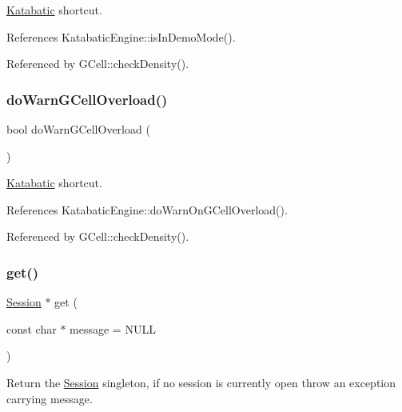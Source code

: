 \mbox{\hyperlink{namespaceKatabatic}{Katabatic}} shortcut. 

References Katabatic\+Engine\+::is\+In\+Demo\+Mode().



Referenced by G\+Cell\+::check\+Density().

\mbox{\label{classKatabatic_1_1Session_ad41e6fb02bd7bb01c27fb6aae36f0ddc}} 
\subsubsection{\texorpdfstring{do\+Warn\+G\+Cell\+Overload()}{doWarnGCellOverload()}}
{\footnotesize\ttfamily bool do\+Warn\+G\+Cell\+Overload (\begin{DoxyParamCaption}{ }\end{DoxyParamCaption})\hspace{0.3cm}{\ttfamily [static]}}

\mbox{\hyperlink{namespaceKatabatic}{Katabatic}} shortcut. 

References Katabatic\+Engine\+::do\+Warn\+On\+G\+Cell\+Overload().



Referenced by G\+Cell\+::check\+Density().

\mbox{\label{classKatabatic_1_1Session_a76f17c3642eaeba85fa0af5ae9d208b4}} 
\subsubsection{\texorpdfstring{get()}{get()}}
{\footnotesize\ttfamily \mbox{\hyperlink{classKatabatic_1_1Session}{Session}} $\ast$ get (\begin{DoxyParamCaption}\item[{const char $\ast$}]{message = {\ttfamily NULL} }\end{DoxyParamCaption})\hspace{0.3cm}{\ttfamily [static]}}

Return the \mbox{\hyperlink{classKatabatic_1_1Session}{Session}} singleton, if no session is currently open throw an exception carrying {\ttfamily message}. \mbox{\label{classKatabatic_1_1Session_a109acfd064f3c1854abb8bb2c9b4ad30}} 
